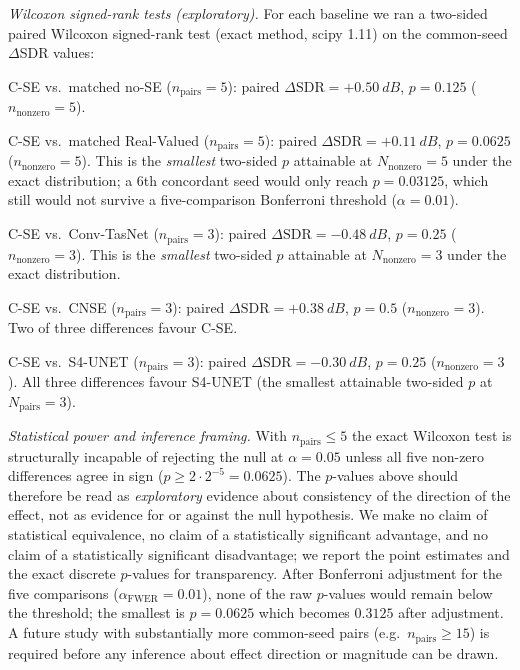 \documentclass[twocolumn,english]{svjour3}
\begin{document}
\emph{Wilcoxon signed-rank tests (exploratory).} For each baseline we ran a two-sided paired Wilcoxon signed-rank test (exact method, scipy 1.11) on the common-seed $\Delta$SDR values:
\begin{compactitem}\sloppy
\item C-SE vs.\ matched no-SE ($n_{\text{pairs}}=5$): paired $\Delta\text{SDR}=+\SI{0.50}{dB}$, $p=0.125$ ($n_{\text{nonzero}}=5$).
\item C-SE vs.\ matched Real-Valued ($n_{\text{pairs}}=5$): paired $\Delta\text{SDR}=+\SI{0.11}{dB}$, $p=0.0625$ ($n_{\text{nonzero}}=5$). This is the \emph{smallest} two-sided $p$ attainable at $N_{\text{nonzero}}{=}5$ under the exact distribution; a 6th concordant seed would only reach $p=0.03125$, which still would not survive a five-comparison Bonferroni threshold ($\alpha=0.01$).
\item C-SE vs.\ Conv-TasNet ($n_{\text{pairs}}=3$): paired $\Delta\text{SDR}=-\SI{0.48}{dB}$, $p=0.25$ ($n_{\text{nonzero}}=3$). This is the \emph{smallest} two-sided $p$ attainable at $N_{\text{nonzero}}{=}3$ under the exact distribution.
\item C-SE vs.\ CNSE ($n_{\text{pairs}}=3$): paired $\Delta\text{SDR}=+\SI{0.38}{dB}$, $p=0.5$ ($n_{\text{nonzero}}=3$). Two of three differences favour C-SE.
\item C-SE vs.\ S4-UNET ($n_{\text{pairs}}=3$): paired $\Delta\text{SDR}=-\SI{0.30}{dB}$, $p=0.25$ ($n_{\text{nonzero}}=3$). All three differences favour S4-UNET (the smallest attainable two-sided $p$ at $N_{\text{pairs}}{=}3$).
\end{compactitem}

\begin{sloppypar}
\emph{Statistical power and inference framing.} With $n_{\text{pairs}}\leq 5$ the exact Wilcoxon test is structurally incapable of rejecting the null at $\alpha=0.05$ unless all five non-zero differences agree in sign ($p\geq 2\cdot 2^{-5}=0.0625$). The $p$-values above should therefore be read as \emph{exploratory} evidence about consistency of the direction of the effect, not as evidence for or against the null hypothesis. We make no claim of statistical equivalence, no claim of a statistically significant advantage, and no claim of a statistically significant disadvantage; we report the point estimates and the exact discrete $p$-values for transparency. After Bonferroni adjustment for the five comparisons ($\alpha_{\text{FWER}}=0.01$), none of the raw $p$-values would remain below the threshold; the smallest is $p=0.0625$ which becomes $0.3125$ after adjustment. A future study with substantially more common-seed pairs (e.g.\ $n_{\text{pairs}}\geq 15$) is required before any inference about effect direction or magnitude can be drawn.
\end{sloppypar}
\end{document}
